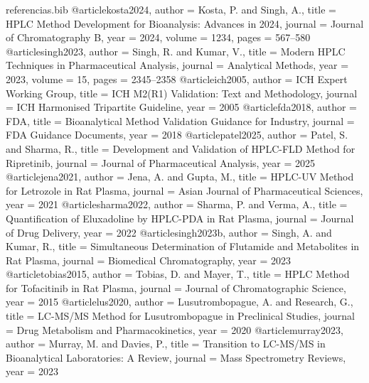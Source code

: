 \begin{filecontents}[overwrite]{referencias.bib}
@article{kosta2024,
  author = {Kosta, P. and Singh, A.},
  title = {HPLC Method Development for Bioanalysis: Advances in 2024},
  journal = {Journal of Chromatography B},
  year = {2024},
  volume = {1234},
  pages = {567--580}
}
@article{singh2023,
  author = {Singh, R. and Kumar, V.},
  title = {Modern HPLC Techniques in Pharmaceutical Analysis},
  journal = {Analytical Methods},
  year = {2023},
  volume = {15},
  pages = {2345--2358}
}
@article{ich2005,
  author = {ICH Expert Working Group},
  title = {ICH M2(R1) Validation: Text and Methodology},
  journal = {ICH Harmonised Tripartite Guideline},
  year = {2005}
}
@article{fda2018,
  author = {FDA},
  title = {Bioanalytical Method Validation Guidance for Industry},
  journal = {FDA Guidance Documents},
  year = {2018}
}
@article{patel2025,
  author = {Patel, S. and Sharma, R.},
  title = {Development and Validation of HPLC-FLD Method for Ripretinib},
  journal = {Journal of Pharmaceutical Analysis},
  year = {2025}
}
@article{jena2021,
  author = {Jena, A. and Gupta, M.},
  title = {HPLC-UV Method for Letrozole in Rat Plasma},
  journal = {Asian Journal of Pharmaceutical Sciences},
  year = {2021}
}
@article{sharma2022,
  author = {Sharma, P. and Verma, A.},
  title = {Quantification of Eluxadoline by HPLC-PDA in Rat Plasma},
  journal = {Journal of Drug Delivery},
  year = {2022}
}
@article{singh2023b,
  author = {Singh, A. and Kumar, R.},
  title = {Simultaneous Determination of Flutamide and Metabolites in Rat Plasma},
  journal = {Biomedical Chromatography},
  year = {2023}
}
@article{tobias2015,
  author = {Tobias, D. and Mayer, T.},
  title = {HPLC Method for Tofacitinib in Rat Plasma},
  journal = {Journal of Chromatographic Science},
  year = {2015}
}
@article{lus2020,
  author = {Lusutrombopague, A. and Research, G.},
  title = {LC-MS/MS Method for Lusutrombopague in Preclinical Studies},
  journal = {Drug Metabolism and Pharmacokinetics},
  year = {2020}
}
@article{murray2023,
  author = {Murray, M. and Davies, P.},
  title = {Transition to LC-MS/MS in Bioanalytical Laboratories: A Review},
  journal = {Mass Spectrometry Reviews},
  year = {2023}
}
\end{filecontents}

\documentclass[OA,linenum]{InterPore}



